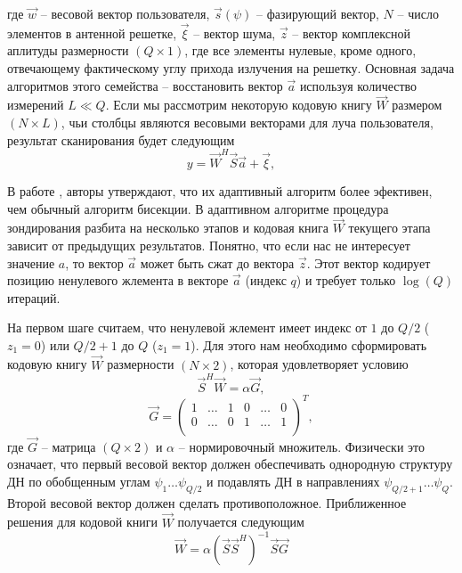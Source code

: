 где $\vec w$ -- весовой вектор пользователя,
$\vec s(\psi)$ -- фазирующий вектор,
$N$ -- число элементов в антенной решетке,
$\vec \xi$ -- вектор шума,
$\vec z$ -- вектор комплексной аплитуды размерности $(Q\times 1)$,
где все элементы нулевые, кроме одного, отвечающему фактическому углу
прихода излучения на решетку.
Основная задача алгоритмов этого семейства -- восстановить вектор $\vec a$
используя количество измерений $L \ll Q$.  Если мы рассмотрим некоторую кодовую
книгу $\vec W$ размером $(N \times L)$, чьи столбцы являются весовыми векторами
для луча пользователя, результат сканирования будет
следующим
\begin{equation}
    \label{eq:4.46}
    y = \vec W^H\vec S \vec a + \vec \xi,
\end{equation}

В работе \cite{Alkhateeb2014}, авторы утверждают, что их адаптивный алгоритм более эфективен,
чем обычный алгоритм бисекции. В адаптивном алгоритме процедура зондирования разбита на несколько этапов
и кодовая книга $\vec W$ текущего этапа зависит от предыдущих результатов. Понятно, что если нас не интересует значение $a$, то
вектор $\vec a$ может быть сжат до вектора $\vec z$. Этот вектор кодирует позицию ненулевого жлемента в векторе $\vec a$ (индекс $q$) и
требует только $\log(Q)$ итераций.

На первом шаге считаем, что ненулевой жлемент имеет индекс от $1$ до $Q/2$ ($z_1=0$) или
$Q/2+1$ до $Q$ ($z_1=1$). Для этого нам необходимо сформировать кодовую книгу $\vec W$ размерности $(N \times 2)$, которая удовлетворяет условию
\begin{equation}
    \label{eq:4.47}
    \vec S^H \vec W = \alpha \vec G,
\end{equation}
\begin{equation}
    \label{eq:4.48}
    \vec G =
    \begin{pmatrix}
        1 & \dots & 1 & 0 & \dots & 0 \\
        0 & \dots & 0 & 1 & \dots & 1 \\
    \end{pmatrix}^T,
\end{equation}
где $\vec G$ -- матрица $(Q \times 2)$ и $\alpha$ -- нормировочный множитель.
Физически это означает, что первый весовой вектор должен обеспечивать однородную структуру ДН по
обобщенным углам $\psi_1 \dots \psi_{Q/2}$ и подавлять ДН в направлениях $\psi_{Q/2 + 1}\dots \psi_Q$. Второй весовой вектор должен сделать противоположное.
Приближенное решения для кодовой книги $\vec W$ получается следующим
\begin{equation}
    \label{eq:4.49}
    \vec W = \alpha (\vec S \vec S^H)^{-1} \vec S \vec G
\end{equation}

